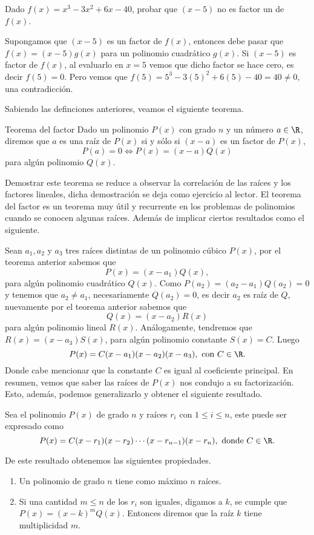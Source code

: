 \begin{example}
    Dado $f(x) = x^3 - 3x^2 + 6x - 40$, probar que $(x - 5)$ no es factor un de $f(x)$.
\end{example}
\begin{solution}
    Supongamos que $(x - 5)$ es un factor de $f(x)$, entonces debe pasar que $f(x) = (x - 5)g(x)$ para un polinomio cuadrático $g(x)$.
    Si $(x - 5)$ es factor de $f(x)$, al evaluarlo en $x = 5$ vemos que dicho factor se hace cero, es decir $f(5) = 0$.
    Pero vemos que $f(5) = 5^3 - 3(5)^2 + 6(5) - 40 = 40 \neq 0$, una contradicción.
\end{solution}

Sabiendo las definciones anteriores, veamos el siguiente teorema.

\begin{theorem.tcb}{Teorema del factor}{}\label{factor-theorem}
Dado un polinomio $P(x)$ con grado $n$ y un número $a \in \R$, diremos que $a$ es una raíz de $P(x)$ si y sólo si $(x - a)$ es un factor de $P(x)$, \ie
\[
    P(a) = 0 \iff P(x) = (x - a)Q(x)
\]
para algún polinomio $Q(x)$.
\end{theorem.tcb}
Demostrar este teorema se reduce a observar la correlación de las raíces y los factores lineales, dicha demostración se deja como ejercicio al lector.
El teorema del factor es un teorema muy útil y recurrente en los problemas de polinomios cuando se conocen algunas raíces.
Además de implicar ciertos resultados como el siguiente.

Sean $a_1, a_2$ y $a_3$ tres raíces distintas de un polinomio cúbico $P(x)$, por el teorema anterior sabemos que
\[
    P(x) = (x - a_1)Q(x),
\]
para algún polinomio cuadrático $Q(x)$.
Como $P(a_2) = (a_2 - a_1)Q(a_2) = 0$ y tenemos que $a_2 \neq a_1$, necesariamente $Q(a_2) = 0$, es decir $a_2$ es raíz de $Q$, nuevamente por el teorema anterior sabemos que
\[
    Q(x) = (x - a_2)R(x)
\]
para algún polinomio lineal $R(x)$.
Análogamente, tendremos que $R(x) = (x - a_3)S(x)$, para algún polinomio constante $S(x) = C$.
Luego
\[
    P(x) = C(x - a_1)(x - a_2)(x - a_3),\ \text{con}\  C \in \R.
\]
Donde cabe mencionar que la constante $C$ es igual al coeficiente principal.
En resumen, vemos que saber las raíces de $P(x)$ nos condujo a su factorización.
Esto, además, podemos generalizarlo y obtener el siguiente resultado.
\begin{remark.tcb}
    Sea el polinomio $P(x)$ de grado $n$ y raíces $r_i$ con $1 \leq i \leq n$, este puede ser expresado como
    \begin{equation}
        P(x) = C(x - r_1)(x - r_2)\cdots(x - r_{n-1})(x - r_n), \ \text{donde}\ C \in \R.
    \end{equation}
\end{remark.tcb}
De este resultado obtenemos las siguientes propiedades.
\begin{enumerate}
    \item Un polinomio de grado $n$ tiene como máximo $n$ raíces.
    \item Si una cantidad $m \leq n$ de los $r_i$ son iguales, digamos a $k$, se cumple que $P(x) = (x - k)^m Q(x)$.
    Entonces diremos que la raíz $k$ tiene multiplicidad $m$.
\end{enumerate}

